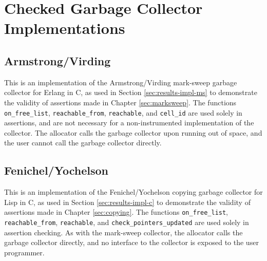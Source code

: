 \chapter{Checked Garbage Collector Implementations}
\label{sec:gc-impl}

\lstset{language=C}

\section{Armstrong/Virding}
\label{sec:gc-impl-armstrong-virding}

This is an implementation of the Armstrong/Virding\cite{Armstrong95}
mark-sweep garbage collector for Erlang in C, as used in Section
\ref{sec:results-impl-ms} to demonstrate the validity of assertions
made in Chapter \ref{sec:marksweep}. The functions
\texttt{on\_free\_list}, \texttt{reachable\_from}, \texttt{reachable},
and \texttt{cell\_id} are used solely in assertions, and are not
necessary for a non-instrumented implementation of the collector. The
allocator calls the garbage collector upon running out of space, and
the user cannot call the garbage collector directly.

\vspace{1cm}

\lstset{label=lst:armstrong-virding-c}


\lstset{label=lst:armstrong-virding-h}


\section{Fenichel/Yochelson}
\label{sec:gc-impl-fenichel-yochelson}

This is an implementation of the Fenichel/Yochelson\cite{Fenichel69}
copying garbage collector for Lisp in C, as used in Section
\ref{sec:results-impl-c} to demonstrate the validity of assertions
made in Chapter \ref{sec:copying}. The functions
\texttt{on\_free\_list}, \texttt{reachable\_from}, \texttt{reachable},
and \texttt{check\_pointers\_updated} are used solely in assertion
checking. As with the mark-sweep collector, the allocator calls the
garbage collector directly, and no interface to the collector is
exposed to the user programmer.

\lstset{label=lst:fenichel-yochelson-c}


